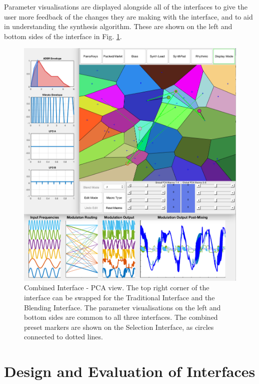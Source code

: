 \documentclass[11pt, oneside]{report}   	%
\begin{document}
 Parameter visualisations are displayed alongside all of the interfaces to give the user more feedback of the changes they are making with the interface, and to aid in understanding the synthesis algorithm. These are shown on the left and bottom sides of the interface in Fig. \ref{fig:CombinedInterface}.
\begin{figure}[h] 
	\centering
	\hspace*{-1.5cm}
	\includegraphics[width = 7.5in]{CombinedInterface1.png}
	\caption{Combined Interface - PCA view. The top right corner of the interface can be swapped for the Traditional Interface and the Blending Interface. The parameter visualisations on the left and bottom sides are common to all three interfaces. The combined preset markers are shown on the Selection Interface, as circles connected to dotted lines.}
	\label{fig:CombinedInterface}
\end{figure}

\chapter{Design and Evaluation of Interfaces}
\end{document}
